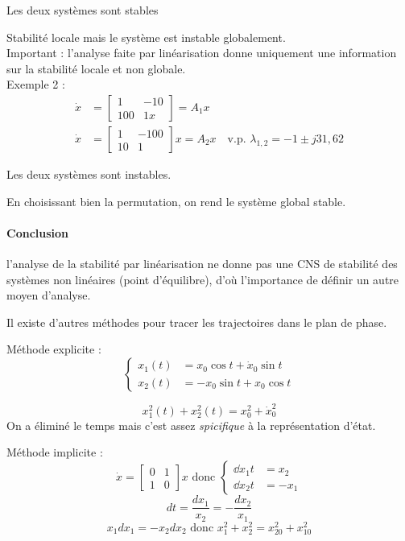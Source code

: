 \documentclass[main.tex]{subfiles}
\begin{document}
Les deux systèmes sont stables

Stabilité locale mais le système est instable globalement.\\

Important : l'analyse faite par linéarisation donne uniquement une information sur la stabilité locale et non globale.\\

Exemple 2 :
\begin{align*}
\dot{x} & =
          \begin{bmatrix}
1 &- 10\\100 & 1 x
\end{bmatrix}
= A_1x \\
\dot{x} & =
          \begin{bmatrix}
1 & -100\\10 & 1
\end{bmatrix}
x = A_2x \quad \text{v.p. } \lambda_{1,2} = -1 \pm j31,62
\end{align*}

Les deux systèmes sont instables.

En choisissant bien la permutation, on rend le système global stable.

\paragraph{Conclusion} l'analyse de la stabilité par linéarisation ne donne pas une CNS de stabilité des systèmes non linéaires (point d'équilibre), d'où l'importance de définir un autre moyen d'analyse. \\

\begin{rem}
Il existe d'autres méthodes pour tracer les trajectoires dans le plan de phase.
\end{rem}

\begin{exemple}
\noindent Méthode explicite :
\[
  \begin{cases}
x_1(t) & = x_0 \cos t + \dot{x}_0 \sin t\\x_2(t) & = -x_0 \sin t + x_0 \cos t
\end{cases}
\]

\[x_1^2(t) + x_2^2(t) = x_0^2 + \dot{x}_0^2 \]
On a éliminé le temps mais c'est assez \emph{spicifique} à la représentation d'état.

\noindent Méthode implicite :
\[ \dot{x} =
  \begin{bmatrix}
0 & 1 \\ 1 & 0
\end{bmatrix}
x \text{ donc }
  \begin{cases}
  \dd{x_1}{t} & = x_2\\ \dd{x_2}{t} & = -x_1
\end{cases}
\]
\[dt = \frac{dx_1}{x_2} = -\frac{dx_2}{x_1}\]
\[x_1dx_1 = -x_2dx_2 \text{ donc } x_1^2 + x_2^2 = x_{20}^2 + x_{10}^2\]
\end{exemple}
\end{document}

